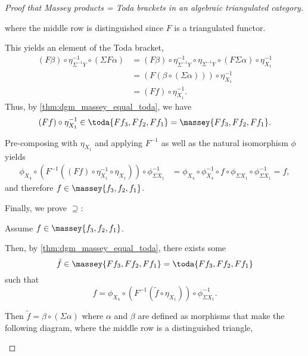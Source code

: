 \begin{proof}[Proof that Massey products = Toda brackets in an algebraic triangulated category]
\begin{center}
    \end{center}

    where the middle row is distinguished since \( F \) is a triangulated functor.

    This yields an element of the Toda bracket,
    \begin{align*}
        (F \beta) \circ \eta^{-1}_{\Sigma^{-1} Y} \circ (\Sigma F \alpha) &= (F \beta) \circ \eta^{-1}_{\Sigma^{-1} Y} \circ \eta_{\Sigma^{-1} Y} \circ (F \Sigma \alpha) \circ \eta^{-1}_{X_1} \\
        &= (F (\beta \circ (\Sigma \alpha))) \circ \eta^{-1}_{X_1} \\
        &= (F f ) \circ \eta^{-1}_{X_1}.
    \end{align*}
    Thus, by \autoref{thm:dgm_massey_equal_toda}, we have
    \[
        (F f ) \circ \eta^{-1}_{X_1} \in \toda{F f_3, F f_2, F f_1} = \massey{F f_3, F f_2, F f_1}.
    \]

    Pre-composing with \( \eta_{X_1} \) and applying \( F^{-1} \) as well as the natural isomorphism \( \phi \) yields
    \begin{align*}
        \phi_{X_4} \circ (F^{-1} ((F f ) \circ \eta^{-1}_{X_1} \circ \eta_{X_1})) \circ \phi^{-1}_{\Sigma X_1} &= \phi_{X_4} \circ \phi^{-1}_{X_4} \circ f \circ \phi_{\Sigma X_1} \circ \phi^{-1}_{\Sigma X_1} = f,
    \end{align*}
    and therefore \( f \in \massey{f_3, f_2, f_1} \).

    Finally, we prove \( \supseteq \):

    Assume \( f \in \massey{f_3, f_2, f_1} \).

    Then, by \autoref{thm:dgm_massey_equal_toda}, there exists some
    \[
        \tilde{f} \in \massey{F f_3, F f_2, F f_1} = \toda{F f_3, F f_2, F f_1}
    \]
    such that
    \[
        f = \phi_{X_4} \circ (F^{-1} (\tilde{f} \circ \eta_{X_1})) \circ \phi^{-1}_{\Sigma X_1}.
    \]

    Then \( \tilde{f} = \beta \circ (\Sigma \alpha) \) where \( \alpha \) and \( \beta \) are defined as morphisms that make the following diagram, where the middle row is a distinguished triangle,
    \begin{center}
\end{center}
\end{proof}
